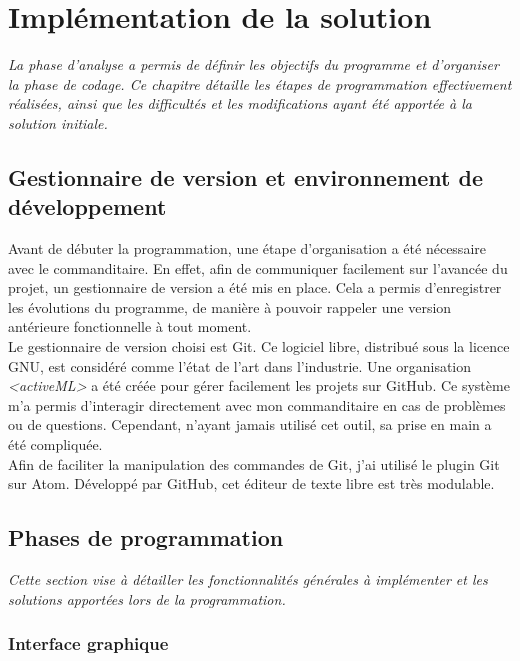 \chapter[Implémentation de la solution]{Implémentation de la solution}

\textit{La phase d'analyse a permis de définir les objectifs du programme et d'organiser la phase de codage. Ce chapitre détaille les étapes de programmation effectivement réalisées, ainsi que les difficultés et les modifications ayant été apportée à la solution initiale.}

\section{Gestionnaire de version et environnement de développement}

Avant de débuter la programmation, une étape d'organisation a été nécessaire avec le commanditaire. En effet, afin de communiquer facilement sur l'avancée du projet, un gestionnaire de version a été mis en place. Cela a permis d'enregistrer les évolutions du programme, de manière à pouvoir rappeler une version antérieure fonctionnelle à tout moment. \\

Le gestionnaire de version choisi est Git. Ce logiciel libre, distribué sous la licence GNU, est considéré comme l'état de l'art dans l'industrie. Une organisation \textit{<activeML>} a été créée pour gérer facilement les projets sur GitHub. Ce système m'a permis d'interagir directement avec mon commanditaire en cas de problèmes ou de questions. Cependant, n'ayant jamais utilisé cet outil, sa prise en main a été compliquée.\\

Afin de faciliter la manipulation des commandes de Git, j'ai utilisé le plugin Git sur Atom. Développé par GitHub, cet éditeur de texte libre est très modulable.

\section{Phases de programmation}

\textit{Cette section vise à détailler les fonctionnalités générales à implémenter et les solutions apportées lors de la programmation.}

\subsection{Interface graphique}

